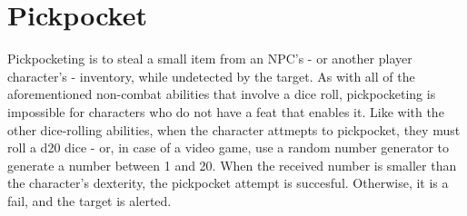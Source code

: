 \section{Pickpocket}
Pickpocketing is to steal a small item  from an NPC's - or another player character's - inventory, while undetected by the target. As with all of the aforementioned non-combat abilities that involve a dice roll, pickpocketing is impossible for characters who do not have a feat that enables it. Like with the other dice-rolling abilities, when the character attmepts to pickpocket, they must roll a d20 dice  - or, in case of a video game, use a random number generator to generate a number between 1 and 20. When the received number is smaller than the character's dexterity, the pickpocket attempt is succesful. Otherwise, it is a fail, and the target is alerted.
